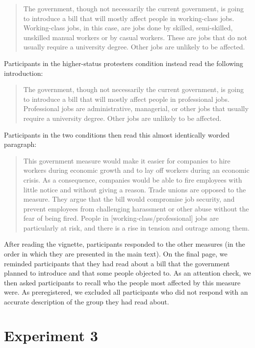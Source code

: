 \documentclass[12pt, letterpaper]{article}
\begin{document}
\begin{quote}
The government, though not necessarily the current government, is going
to introduce a bill that will mostly affect people in working-class
jobs. Working-class jobs, in this case, are jobs done by skilled,
semi-skilled, unskilled manual workers or by casual workers. These are
jobs that do not usually require a university degree. Other jobs are
unlikely to be affected.
\end{quote}

\noindent Participants in the higher-status protesters condition instead
read the following introduction:

\begin{quote}
The government, though not necessarily the current government, is going
to introduce a bill that will mostly affect people in professional jobs.
Professional jobs are administrative, managerial, or other jobs that
usually require a university degree. Other jobs are unlikely to be
affected.
\end{quote}

\noindent Participants in the two conditions then read this almost
identically worded paragraph:

\begin{quote}
This government measure would make it easier for companies to hire
workers during economic growth and to lay off workers during an economic
crisis. As a consequence, companies would be able to fire employees with
little notice and without giving a reason. Trade unions are opposed to
the measure. They argue that the bill would compromise job security, and
prevent employees from challenging harassment or other abuse without the
fear of being fired. People in {[}working-class/professional{]} jobs are
particularly at risk, and there is a rise in tension and outrage among
them.
\end{quote}

After reading the vignette, participants responded to the other measures
(in the order in which they are presented in the main text). On the
final page, we reminded participants that they had read about a bill
that the government planned to introduce and that some people objected
to. As an attention check, we then asked participants to recall who the
people most affected by this measure were. As preregistered, we excluded
all participants who did not respond with an accurate description of the
group they had read about.

\hypertarget{experiment-3}{%
\section{Experiment 3}\label{experiment-3}}
\end{document}
